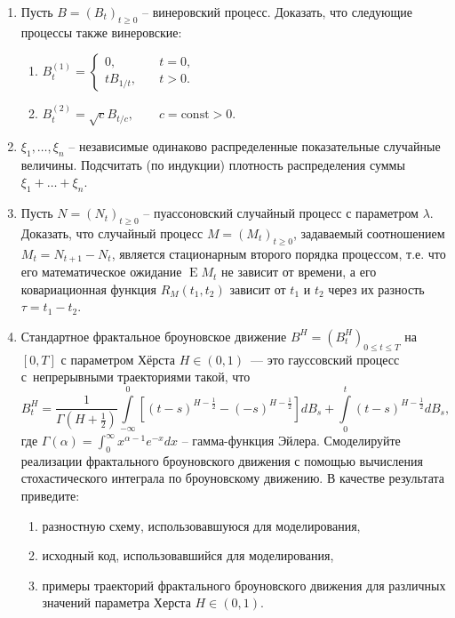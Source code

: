 \documentclass[a4paper,14pt]{extreport}
\renewcommand{\=}[1]{\stackrel{#1}{=}} %
\newcommand{\Expect}{\mathop{{}\mathrm{E}}}
\newcommand{\generaltime}{t \geqslant 0}
\newcommand{\finiteconttime}[1]{0 \leqslant t \leqslant #1}
\newcommand{\newprocess}[1]{
	\ensuremath{
		#1 = \left(#1 _t\right)_{\generaltime}
	}
}
\newcommand{\newprocessfc}[2]{
	\ensuremath{
		#1 = \left(#1 _t\right)_{\finiteconttime{#2}}
	}
}
\newcommand{\fbm}{B^H}
\begin{document}
\begin{enumerate}
\item Пусть $\newprocess{B}$ -- винеровский процесс. Доказать,
что следующие процессы также винеровские:
\begin{enumerate}
	\item $B_t^{(1)} = 
	\begin{cases}
		0, \quad & t = 0, \\
		t B_{1/t}, \quad & t > 0.
	\end{cases}$
	\item $B_t^{(2)} = 
	\sqrt{c} B_{t/c}, \qquad c = \mathrm{const} > 0$.
\end{enumerate}

\item $\xi_1, \ldots, \xi_n$ -- независимые одинаково распределенные 
показательные случайные величины.
Подсчитать (по индукции) плотность распределения суммы
$\xi_1 + \ldots + \xi_n$.

\item Пусть $\newprocess{N}$ -- пуассоновский случайный
процесс с параметром $\lambda$. Доказать, что случайный
процесс $\newprocess{M}$, задаваемый соотношением
$M_t = N_{t+1} - N_t$, является стационарным второго порядка
процессом, т.е. что его математическое ожидание $\Expect M_t$
не зависит от времени, а его ковариационная функция
$R_M(t_1, t_2)$ зависит от $t_1$ и $t_2$ через их разность
$\tau = t_1 - t_2$.

\item Стандартное фрактальное броуновское движение $\newprocessfc{\fbm}{T}$
на $[0,T]$ с параметром Хёрста $H \in (0,1)$~---
это гауссовский процесс с~непрерывными траекториями такой, что
\[
\fbm_t = \frac{1}{\Gamma(H + \frac 1 2)}
	\int\limits_{-\infty}^{0} [(t - s)^{H - \frac 1 2 } - (-s)^{H-\frac 1 2}] dB_s
	+ \int\limits_{0}^{t} (t - s)^{H - \frac 1 2 } dB_s,
\]
где 
$\Gamma(\alpha) = \int_0^{\infty} x^{\alpha - 1} e^{-x} dx$ -- гамма-функция Эйлера.
Смоделируйте реализации фрактального броуновского
движения с помощью вычисления стохастического интеграла
по броуновскому движению. В качестве результата
приведите:
\begin{enumerate}
	\item разностную схему, использовавшуюся для моделирования,
	\item исходный код, использовавшийся для моделирования,
	\item примеры траекторий фрактального броуновского движения
	для различных значений параметра Херста $H \in (0, 1)$.
\end{enumerate}


\end{enumerate}
\end{document}
